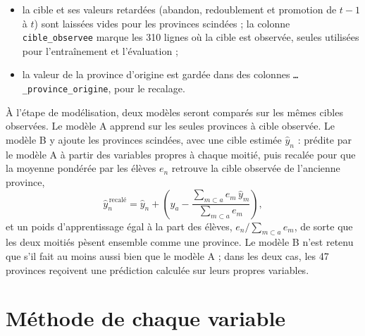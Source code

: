 \documentclass{article}
\begin{document}
\begin{itemize}
\item la cible et ses valeurs retardées (abandon, redoublement et promotion de $t-1$ à $t$) sont laissées vides pour les provinces scindées ; la colonne \texttt{cible\_observee} marque les 310 lignes où la cible est observée, seules utilisées pour l'entraînement et l'évaluation ;
\item la valeur de la province d'origine est gardée dans des colonnes \texttt{…\_province\_origine}, pour le recalage.
\end{itemize}

À l'étape de modélisation, deux modèles seront comparés sur les mêmes cibles observées. Le modèle A apprend sur les seules provinces à cible observée. Le modèle B y ajoute les provinces scindées, avec une cible estimée $\hat{y}_n$ : prédite par le modèle A à partir des variables propres à chaque moitié, puis recalée pour que la moyenne pondérée par les élèves $e_n$ retrouve la cible observée de l'ancienne province,
\begin{equation}
\hat{y}^{\,\text{recalé}}_{n} = \hat{y}_n + \left( y_a - \frac{\sum_{m \subset a} e_m\, \hat{y}_m}{\sum_{m \subset a} e_m} \right),
\end{equation}
et un poids d'apprentissage égal à la part des élèves, $e_n / \sum_{m \subset a} e_m$, de sorte que les deux moitiés pèsent ensemble comme une province. Le modèle B n'est retenu que s'il fait au moins aussi bien que le modèle A ; dans les deux cas, les 47 provinces reçoivent une prédiction calculée sur leurs propres variables.

\section{Méthode de chaque variable}
\end{document}
